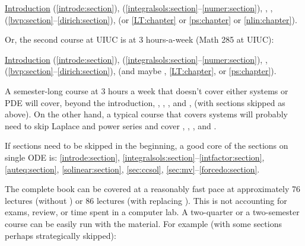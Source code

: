 \medskip

\noindent
\hyperref[intro:chapter]{Introduction} (\ref{introde:section}),
 (\ref{integralsols:section}--\ref{numer:section}),
,
,
 (\ref{bvp:section}--\ref{dirich:section}),
 (or
\ref{LT:chapter} or \ref{ps:chapter} or \ref{nlin:chapter}).

\medskip

Or, the second course at UIUC is at 3 hours-a-week (Math 285 at UIUC):

\medskip

\noindent
\hyperref[intro:chapter]{Introduction} (\ref{introde:section}),
 (\ref{integralsols:section}--\ref{numer:section}),
,
 (\ref{bvp:section}--\ref{dirich:section}),
(and maybe ,
\ref{LT:chapter}, or \ref{ps:chapter}).

\medskip

A semester-long course at 3 hours a week that doesn't cover either systems or PDE
will cover, beyond the introduction,
,
,
, and ,
(with sections skipped as above).
On the other hand, a typical course that covers 
systems will probably need to skip Laplace and power series
and cover
,
,
, and .

\medskip

If sections need to be skipped in the beginning, a good core of the 
sections on single ODE is:
\ref{introde:section},
\ref{integralsols:section}--\ref{intfactor:section},
\ref{auteq:section},
\ref{solinear:section},
\ref{sec:ccsol},
\ref{sec:mv}--\ref{forcedo:section}.

\medskip

The complete book can be covered at a reasonably
fast pace at approximately 76 lectures
(without )
or 86 lectures (with  replacing
).
This is not accounting for exams, review,
or time spent in a computer lab. %
A two-quarter or a two-semester course can be easily run with the material.
For example (with some sections perhaps strategically skipped):

\medskip

